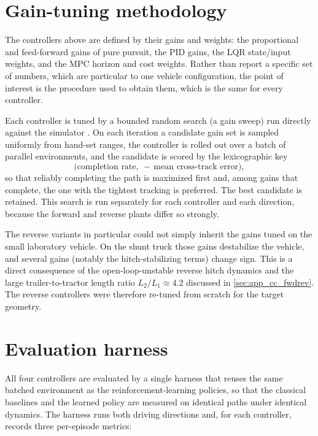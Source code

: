 \section{Gain-tuning methodology}
\label{sec:app_cc_tuning}

The controllers above are defined by their gains and weights: the proportional and
feed-forward gains of pure pursuit, the PID gains, the LQR state/input weights, and the
MPC horizon and cost weights. Rather than report a specific set of numbers, which are
particular to one vehicle configuration, the point of interest is the procedure used to
obtain them, which is the same for every controller.

Each controller is tuned by a bounded random search (a gain sweep) run directly against
the simulator \cite{storn1997differential}. On each iteration a candidate gain set is
sampled uniformly from hand-set ranges, the controller is rolled out over a batch of
parallel environments, and the candidate is scored by the lexicographic key
\begin{equation}
    \bigl(\text{completion rate},\ -\,\text{mean cross-track error}\bigr),
    \label{eq:app_cc_tuning_key}
\end{equation}
so that reliably completing the path is maximized first and, among gains that complete,
the one with the tightest tracking is preferred. The best candidate is retained. This
search is run separately for each controller and each direction, because the
forward and reverse plants differ so strongly.

The reverse variants in particular could not simply inherit the gains tuned on the small
laboratory vehicle. On the shunt truck those gains destabilize the vehicle, and several
gains (notably the hitch-stabilizing terms) change sign. This is a direct consequence of
the open-loop-unstable reverse hitch dynamics and the large trailer-to-tractor length
ratio $L_2/L_1 \approx 4.2$ discussed in \cref{sec:app_cc_fwdrev}. The reverse controllers
were therefore re-tuned from scratch for the target geometry.

\section{Evaluation harness}
\label{sec:app_cc_eval}

All four controllers are evaluated by a single harness that reuses the same batched
environment as the reinforcement-learning policies, so that the classical baselines and
the learned policy are measured on identical paths under identical dynamics. The harness
runs both driving directions and, for each controller, records three per-episode metrics:

